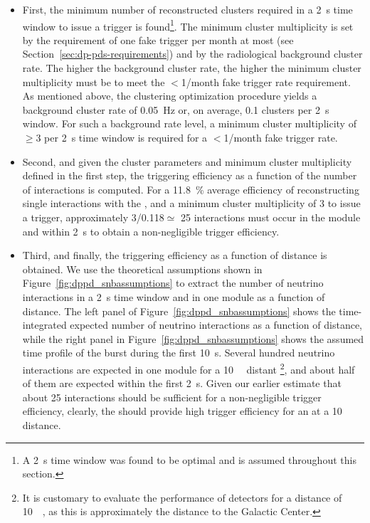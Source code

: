 \begin{itemize}
\item First, the minimum number of reconstructed clusters required in a \SI{2}{\s} time window  to issue a trigger is found\footnote{A \SI{2}{\s} time window was found to be optimal and is assumed throughout this section.}. The minimum cluster multiplicity is set by the requirement of one fake trigger per month at most (see Section~\ref{sec:dp-pds-requirements}) and by the radiological background cluster rate. The higher the background cluster rate, the higher the minimum cluster multiplicity must be to meet the $<$\num{1}/month fake trigger rate requirement. As mentioned above, the clustering optimization procedure yields a background cluster rate of \SI{0.05}{\Hz} or, on average, \num{0.1} clusters per \SI{2}{\s} window. For such a background rate level, a minimum cluster multiplicity of $\ge$\num{3} per \SI{2}{\s} time window is required for a $<$\num{1}/month fake trigger rate.
%
\item Second, and given the cluster parameters and minimum cluster multiplicity defined in the first step, the  triggering efficiency as a function of the number of  interactions is computed. For a \SI{11.8}{\%} average efficiency of reconstructing single  \nue interactions with the , and a minimum cluster multiplicity of \num{3} to issue a trigger, approximately \num{3}/\num{0.118}$\simeq$ \num{25} interactions must occur in the  module and within \SI{2}{\s} to obtain a non-negligible trigger efficiency. 
%
\item Third, and finally, the  triggering efficiency as a function of  distance is obtained. We use the theoretical assumptions shown in Figure~\ref{fig:dppd_snbassumptions} to extract the number of  neutrino interactions in a \SI{2}{\s} time window and in one   module as a function of  distance. The left panel of Figure~\ref{fig:dppd_snbassumptions} shows the time-integrated expected number of  neutrino interactions as a function of distance, while the right panel in Figure~\ref{fig:dppd_snbassumptions} shows the assumed time profile of the burst during the first \SI{10}{\s}. Several hundred  neutrino interactions are expected in one   module for a \SI{10}{\kilo\parsec} distant \footnote{It is customary to evaluate the performance of  detectors for a  distance of \SI{10}{\kilo\parsec}, as this is approximately the distance to the Galactic Center.}, and about half of them are expected within the first \SI{2}{\s}. Given our earlier estimate that about \num{25} interactions should be sufficient for a non-negligible trigger efficiency, clearly, the  should provide high  trigger efficiency for an  at a \SI{10}{\kilo\parsec} distance.
\end{itemize}

